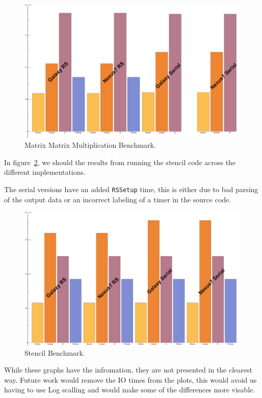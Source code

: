 \begin{figure}[t!]
\includegraphics[scale=0.125]{Sgemm.png}
\caption{Matrix Matrix Multiplication Benchmark.}
\label{fig:sgemm}
\centering
\end{figure}



In figure~\ref{fig:stencil}, we should the results from running the stencil code across the different
  implementations.

The serial versions have an added {\tt RSSetup} time, this is either due to bad parsing of the 
  output data or an incorrect labeling of a timer in the source code.

\begin{figure}[t!]
\includegraphics[scale=0.125]{Stencil.png}
\caption{Stencil Benchmark.}
\label{fig:stencil}
\centering
\end{figure}


While these graphs have the infromation, they are not presented in the clearest way.
Future work would remove the IO times from the plots, this would avoid us having to use Log scalling
  and would make some of the differences more visable.
  

